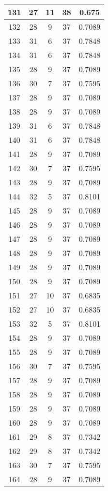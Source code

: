 \documentclass[letterpaper, 12pt]{article}
\begin{document}
\begin{longtable}{|c|c|c|c|c|}
\hline
131 & 27 & 11 & 38 & 0.675 \\
\hline
132 & 28 & 9 & 37 & 0.7089 \\
\hline
133 & 31 & 6 & 37 & 0.7848 \\
\hline
134 & 31 & 6 & 37 & 0.7848 \\
\hline
135 & 28 & 9 & 37 & 0.7089 \\
\hline
136 & 30 & 7 & 37 & 0.7595 \\
\hline
137 & 28 & 9 & 37 & 0.7089 \\
\hline
138 & 28 & 9 & 37 & 0.7089 \\
\hline
139 & 31 & 6 & 37 & 0.7848 \\
\hline
140 & 31 & 6 & 37 & 0.7848 \\
\hline
141 & 28 & 9 & 37 & 0.7089 \\
\hline
142 & 30 & 7 & 37 & 0.7595 \\
\hline
143 & 28 & 9 & 37 & 0.7089 \\
\hline
144 & 32 & 5 & 37 & 0.8101 \\
\hline
145 & 28 & 9 & 37 & 0.7089 \\
\hline
146 & 28 & 9 & 37 & 0.7089 \\
\hline
147 & 28 & 9 & 37 & 0.7089 \\
\hline
148 & 28 & 9 & 37 & 0.7089 \\
\hline
149 & 28 & 9 & 37 & 0.7089 \\
\hline
150 & 28 & 9 & 37 & 0.7089 \\
\hline
151 & 27 & 10 & 37 & 0.6835 \\
\hline
152 & 27 & 10 & 37 & 0.6835 \\
\hline
153 & 32 & 5 & 37 & 0.8101 \\
\hline
154 & 28 & 9 & 37 & 0.7089 \\
\hline
155 & 28 & 9 & 37 & 0.7089 \\
\hline
156 & 30 & 7 & 37 & 0.7595 \\
\hline
157 & 28 & 9 & 37 & 0.7089 \\
\hline
158 & 28 & 9 & 37 & 0.7089 \\
\hline
159 & 28 & 9 & 37 & 0.7089 \\
\hline
160 & 28 & 9 & 37 & 0.7089 \\
\hline
161 & 29 & 8 & 37 & 0.7342 \\
\hline
162 & 29 & 8 & 37 & 0.7342 \\
\hline
163 & 30 & 7 & 37 & 0.7595 \\
\hline
164 & 28 & 9 & 37 & 0.7089 \\

\end{longtable}
\end{document}

